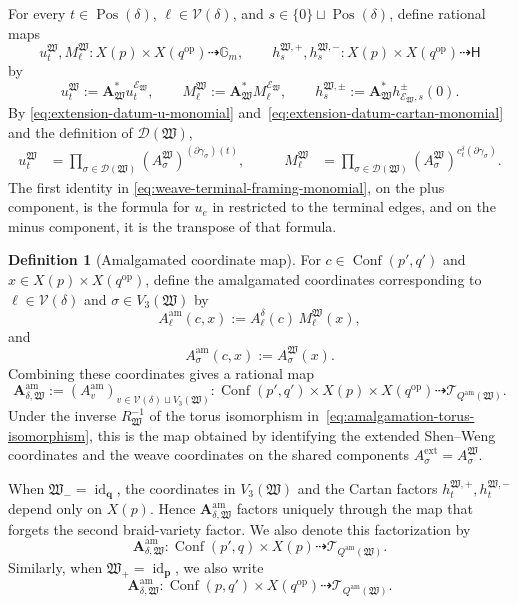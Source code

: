 \documentclass[10pt,a4paper]{article}
\theoremstyle{definition}
\newtheorem{definition}[theorem]{Definition}
\theoremstyle{remark}
\newcommand{\Gm}{\mathbb G_m}
\newcommand{\torusH}{\mathsf{H}}
\newcommand{\Conf}{\operatorname{Conf}}
\newcommand{\Tcal}{\mathcal T}
\newcommand{\Dcal}{\mathcal D}
\newcommand{\Vcal}{\mathcal V}
\newcommand{\fW}{\mathfrak W}
\newcommand{\id}{\operatorname{id}}
\begin{document}
For every \(t\in\operatorname{Pos}(\delta)\), \(\ell\in\Vcal(\delta)\), and
\(s\in\{0\}\sqcup\operatorname{Pos}(\delta)\), define rational maps
\[
 u_t^\fW,M_\ell^\fW:
 X(p)\times X(q^{\mathrm{op}})\dashrightarrow\Gm,
 \qquad
 h_s^{\fW,+},h_s^{\fW,-}:
 X(p)\times X(q^{\mathrm{op}})\dashrightarrow\torusH
\]
by
\[
 u_t^\fW:=\mathbf A_\fW^*u_t^{\mathcal E_\fW},\qquad
 M_\ell^\fW:=\mathbf A_\fW^*M_\ell^{\mathcal E_\fW},\qquad
 h_s^{\fW,\pm}:=\mathbf A_\fW^*h_{\mathcal E_\fW,s}^\pm(0).
\]
By \eqref{eq:extension-datum-u-monomial}
and~\eqref{eq:extension-datum-cartan-monomial} and the definition of
\(\Dcal(\fW)\),
\begin{equation}
 \begin{aligned}
  u_t^\fW
  &=\prod_{\sigma\in\Dcal(\fW)}
    (A_\sigma^\fW)^{(\partial\gamma_\sigma)(t)},
  &\qquad
  M_\ell^\fW
  &=\prod_{\sigma\in\Dcal(\fW)}
    (A_\sigma^\fW)^{c_\ell^\delta(\partial\gamma_\sigma)}.
 \end{aligned}
 \label{eq:weave-terminal-framing-monomial}
\end{equation}
The first identity in \eqref{eq:weave-terminal-framing-monomial}, on
the plus component, is the formula for \(u_e\) in
\cite[Section~5]{CasalsEtAlBraidVarieties} restricted to the terminal edges, and on the minus
component, it is the transpose of that formula.
\begin{definition}[Amalgamated coordinate map]
\label{def:amalgamated-functions}
For \(c\in\Conf(p',q')\) and
\(x\in X(p)\times X(q^{\mathrm{op}})\), define the amalgamated coordinates
corresponding to \(\ell\in\Vcal(\delta)\) and \(\sigma\in V_3(\fW)\) by
\begin{equation}
 A_\ell^{\mathrm{am}}(c,x)
 :=
 A_\ell^\delta(c)\,M_\ell^\fW(x),
 \label{eq:terminal-coordinate}
\end{equation}
and
\[
 A_\sigma^{\mathrm{am}}(c,x):=A_\sigma^\fW(x).
\]
Combining these coordinates gives a rational map
\begin{equation}
 \mathbf A_{\delta,\fW}^{\mathrm{am}}
 :=
 (A_v^{\mathrm{am}})_{v\in\Vcal(\delta)\sqcup V_3(\fW)}:
 \Conf(p',q')
 \times X(p)\times X(q^{\mathrm{op}})
 \dashrightarrow\Tcal_{Q^{\mathrm{am}}(\fW)}.
 \label{eq:def-Aam}
\end{equation}
Under the inverse \(R_\fW^{-1}\) of the torus isomorphism
in~\eqref{eq:amalgamation-torus-isomorphism}, this is the map obtained by
identifying the extended Shen--Weng coordinates and the weave coordinates on
the shared components \(A_\sigma^{\mathrm{ext}}=A_\sigma^\fW\).

When \(\fW_-=\id_{\mathbf q}\), the coordinates in \(V_3(\fW)\) and the
Cartan factors \(h_t^{\fW,+},h_t^{\fW,-}\) depend only on \(X(p)\).  Hence
\(\mathbf A_{\delta,\fW}^{\mathrm{am}}\) factors uniquely through the map
that forgets the second braid-variety factor.  We also denote this
factorization by
\[
 \mathbf A_{\delta,\fW}^{\mathrm{am}}:
 \Conf(p',q)\times X(p)
 \dashrightarrow\Tcal_{Q^{\mathrm{am}}(\fW)}.
\]
Similarly, when \(\fW_+=\id_{\mathbf p}\), we also write
\[
 \mathbf A_{\delta,\fW}^{\mathrm{am}}:
 \Conf(p,q')
 \times X(q^{\mathrm{op}})
 \dashrightarrow\Tcal_{Q^{\mathrm{am}}(\fW)}.
\]
\end{definition}
\end{document}
